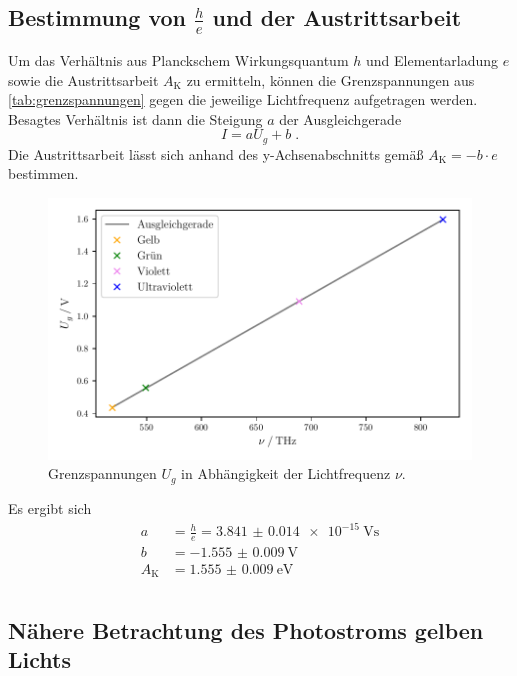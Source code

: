 \subsection{Bestimmung von \texorpdfstring{$\frac{h}{e}$}{h/e} und der Austrittsarbeit}
\label{sec:auswertung:gelb_full}

Um das Verhältnis aus Planckschem Wirkungsquantum $h$ und Elementarladung $e$
sowie die Austrittsarbeit $A_\text{K}$ zu ermitteln,
können die Grenzspannungen aus \autoref{tab:grenzspannungen}
gegen die jeweilige Lichtfrequenz aufgetragen werden.
Besagtes Verhältnis ist dann die Steigung $a$ der Ausgleichgerade
\[ I = a U_g + b \; . \]
Die Austrittsarbeit lässt sich anhand des y-Achsenabschnitts gemäß $A_\text{K} = - b \cdot e$ bestimmen.

\begin{figure}[H]
  \centering
  \includegraphics[width=\textwidth]{build/plot_nu_ug.pdf}
  \caption{Grenzspannungen $U_g$ in Abhängigkeit der Lichtfrequenz $\nu$.}
  \label{fig:plot_nu_ug}
\end{figure}

Es ergibt sich
\begin{align*}
  a &= \frac{h}{e} = \SI{3.841(14)e-15}{\volt\second} \\
  b &= \SI{-1.555(9)}{\volt} \\
  A_\text{K} &= \SI{1.555(9)}{\electronvolt} \\
\end{align*}

\subsection{Nähere Betrachtung des Photostroms gelben Lichts}

